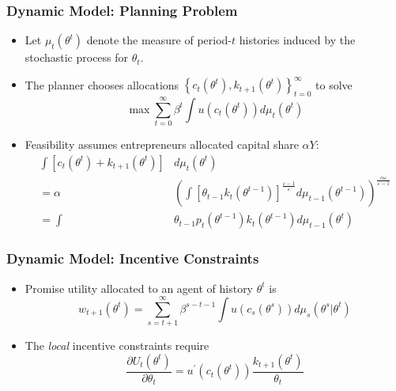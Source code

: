 \documentclass{beamer}
\begin{document}
\begin{frame}
    \frametitle{Dynamic Model: Planning Problem}

    \begin{itemize}
        \item Let $\mu_{t}\left(\theta^{t}\right)$ denote the measure of period-$t$
        histories induced by the stochastic process for $\theta_{t}$. 
        \item The planner chooses allocations $\left\{ c_{t}\left(\theta^{t}\right),k_{t+1}\left(\theta^{t}\right)\right\} _{t=0}^{\infty}$
        to solve 
        \begin{equation}
        \max\sum_{t=0}^{\infty}\beta^{t}\int u\left(c_{t}\left(\theta^{t}\right)\right)d\mu_{t}\left(\theta^{t}\right)\label{eq:dyn_plan}
        \end{equation} 
        \item Feasibility assumes entrepreneurs allocated capital share \( \alpha Y\):
        \begin{align*}
            \int\left[c_{t}\left(\theta^{t}\right)+k_{t+1}\left(\theta^{t}\right)\right]&d\mu_{t}\left(\theta^{t}\right) \\ = \alpha&\left(\int\left[\theta_{t-1}k_{t}\left(\theta^{t-1}\right)\right]^{\frac{\varepsilon-1}{\varepsilon}}d\mu_{t-1}\left(\theta^{t-1}\right)\right)^{\frac{\alpha\varepsilon}{\varepsilon-1}} \\
            = \int&\theta_{t-1}p_{t}\left(\theta^{t-1}\right)k_{t}\left(\theta^{t-1}\right)d\mu_{t-1}\left(\theta^{t}\right)
        \end{align*}
    \end{itemize}

\end{frame}

\begin{frame}
    \frametitle{Dynamic Model: Incentive Constraints}

    \begin{itemize}
        \item Promise utility allocated to an agent of history $\theta^{t}$ is
        \begin{equation*}
        w_{t+1}\left(\theta^{t}\right)=\sum_{s=t+1}^{\infty}\beta^{s-t-1}\int u\left(c_{s}\left(\theta^{s}\right)\right)d\mu_{s}\left(\theta^{s}\big|\theta^{t}\right)
        \end{equation*} 
        \item The \textit{local} incentive constraints require 
        \begin{equation*}
            \frac{\partial U_t \left( \theta^t \right)}{\partial \theta_t}=u^{\prime}\left(c_{t}\left(\theta^{t}\right)\right)\frac{k_{t+1}\left(\theta^{t}\right)}{\theta_{t}}
        \end{equation*}
    \end{itemize}

\end{frame}
\end{document}
